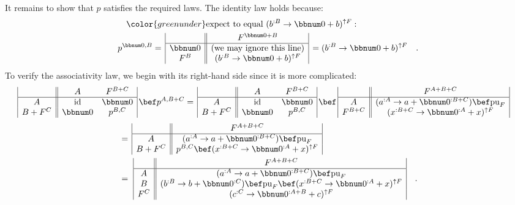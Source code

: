 It remains to show that $p$ satisfies the required laws. The identity
law holds because:
\begin{align*}
 & \quad{\color{greenunder}\text{expect to equal }(b^{:B}\rightarrow\bbnum 0+b)^{\uparrow F}:}\quad\\
 & p^{\bbnum 0,B}=\,\begin{array}{|c||c|}
 & F^{\bbnum 0+B}\\
\hline \bbnum 0 & \text{(we may ignore this line)}\\
F^{B} & (b^{:B}\rightarrow\bbnum 0+b)^{\uparrow F}
\end{array}\,=(b^{:B}\rightarrow\bbnum 0+b)^{\uparrow F}\quad.
\end{align*}
To verify the associativity law, we begin with its right-hand side
since it is more complicated:
\begin{align*}
 & \begin{array}{|c||cc|}
 & A & F^{B+C}\\
\hline A & \text{id} & \bbnum 0\\
B+F^{C} & \bbnum 0 & p^{B,C}
\end{array}\,\bef p^{A,B+C}=\,\begin{array}{|c||cc|}
 & A & F^{B+C}\\
\hline A & \text{id} & \bbnum 0\\
B+F^{C} & \bbnum 0 & p^{B,C}
\end{array}\,\bef\,\begin{array}{|c||c|}
 & F^{A+B+C}\\
\hline A & (a^{:A}\rightarrow a+\bbnum 0^{:B+C})\bef\text{pu}_{F}\\
F^{B+C} & (x^{:B+C}\rightarrow\bbnum 0^{:A}+x)^{\uparrow F}
\end{array}
\end{align*}
\begin{align*}
 & =\,\begin{array}{|c||c|}
 & F^{A+B+C}\\
\hline A & (a^{:A}\rightarrow a+\bbnum 0^{:B+C})\bef\text{pu}_{F}\\
B+F^{C} & p^{B,C}\bef(x^{:B+C}\rightarrow\bbnum 0^{:A}+x)^{\uparrow F}
\end{array}\\
 & =\,\,\begin{array}{|c||c|}
 & F^{A+B+C}\\
\hline A & (a^{:A}\rightarrow a+\bbnum 0^{:B+C})\bef\text{pu}_{F}\\
B & (b^{:B}\rightarrow b+\bbnum 0^{:C})\bef\text{pu}_{F}\bef(x^{:B+C}\rightarrow\bbnum 0^{:A}+x)^{\uparrow F}\\
F^{C} & (c^{:C}\rightarrow\bbnum 0^{:A+B}+c)^{\uparrow F}
\end{array}\quad.
\end{align*}
